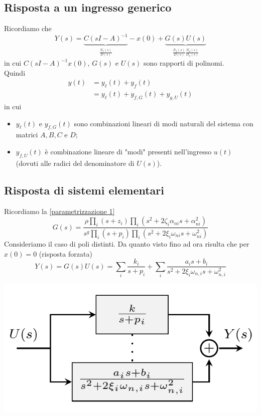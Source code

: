 \documentclass{article}
\numberwithin{equation}{subsection}
\let\oldsubsection\subsection%
\renewcommand{\subsection}{%
  \renewcommand{\theequation}{\thesubsection.\arabic{equation}}%
  \oldsubsection}%
\begin{document}
\subsection{Risposta a un ingresso generico}
Ricordiamo che 
\[
    Y(s) = \underbrace{C(sI-A)^{-1}}_{\begin{array}{c}\frac{N_\ell(s)}{D(s)}\end{array}} -x(0) + \underbrace{G(s)U(s)}_{\begin{array}{c}\frac{N_f(s)}{D(s)}\frac{N_u(s)}{D_u(s)}\end{array}}
\]
in cui $C(sI-A)^{-1} x(0)$, $G(s)$ e $U(s)$ sono rapporti di polinomi.\\
Quindi
\begin{align*}
    y(t) 
    &= y_\ell(t) + y_f(t)
    \\
    &=y_\ell(t) + y_{f,G}(t) + y_{g,U}(t)
\end{align*}
in cui 
\begin{itemize}
    \item  $y_\ell (t)$ e $y_{f,G} (t)$ sono combinazioni lineari di modi naturali del sistema con matrici $A, B, C$ e $D$;
    \item $y_{f,U} (t)$ è combinazione lineare di "modi" presenti nell'ingresso $u(t)$ (dovuti alle radici del denominatore di $U (s)$).
\end{itemize}



\subsection{Risposta di sistemi elementari}
Ricordiamo la \ref{parametrizzazione 1} 
\[
    G(s) = \frac{\rho \prod_i (s + z_i)\prod_i (s^2+2 \zeta_i \alpha_{ni}s  +\alpha^2_{ni})}
                {s^g \prod_i (s + p_i)\prod_i (s^2+2 \xi_i \omega_{ni}s + \omega^2_{ni})}
\]
Consideriamo il caso di poli distinti. Da quanto visto fino ad ora risulta che per $x(0) = 0$ (risposta forzata)
\[
    Y(s) = G(s)U(s) = \sum_{i} \frac{k_i}{s+p_i} + \sum_i \frac{a_i s+b_i}{s^2 + 2\xi_i\omega_{n,i}s + \omega^2_{n,i}}
\]
\begin{center}
    \includegraphics[scale=0.27]{Images/Risposta_sistemi_elementari.png}
\end{center}
\end{document}
